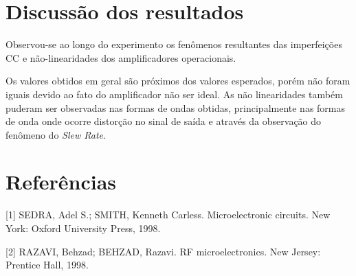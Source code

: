 \documentclass{abntex2}
\begin{document}
\section{Discussão dos resultados}

Observou-se ao longo do experimento os fenômenos resultantes das imperfeições CC e não-linearidades dos amplificadores operacionais.

Os valores obtidos em geral são próximos dos valores esperados, porém não foram iguais devido ao fato do amplificador não ser ideal. As não linearidades também puderam ser observadas nas formas de ondas obtidas, principalmente nas formas de onda onde ocorre distorção no sinal de saída e através da observação do fenômeno do \emph{Slew Rate}.

\clearpage

\section*{Referências}

[1] SEDRA, Adel S.; SMITH, Kenneth Carless. Microelectronic circuits. New York: Oxford University Press, 1998.

[2] RAZAVI, Behzad; BEHZAD, Razavi. RF microelectronics. New Jersey: Prentice Hall, 1998.
\end{document}
